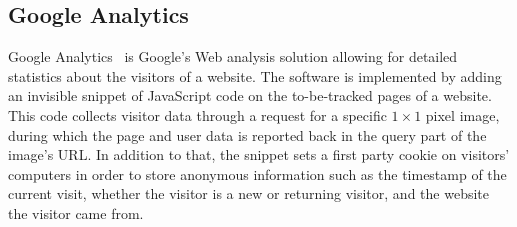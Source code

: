 \documentclass[10pt,twocolumn,letterpaper]{article}
\begin{document}
\subsection{Google Analytics}
Google Analytics~\cite{googleanalytics} is Google's Web analysis solution allowing for detailed statistics about the visitors of a website. The software is implemented by adding an invisible snippet of JavaScript code on the to-be-tracked pages of a website. This code collects visitor data through a request for a specific $1 \times 1$ pixel image, during which the page and user data is reported back in the query part of the image's URL. In addition to that, the snippet sets a first party cookie on visitors' computers in order to store anonymous information such as the timestamp of the current visit, whether the visitor is a new or returning visitor, and the website the visitor came from.
\end{document}
